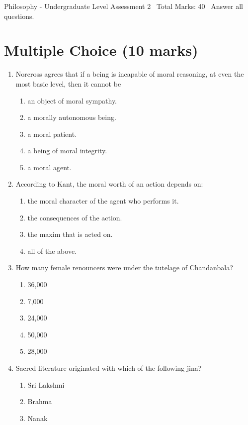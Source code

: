 \documentclass[12pt]{article}
\begin{document}
\begin{center}
Philosophy - Undergraduate Level Assessment 2 \
Total Marks: 40 \
Answer all questions.
\end{center}

\section*{Multiple Choice (10 marks)}
\begin{enumerate}[label=\arabic*.]
\item Norcross agrees that if a being is incapable of moral reasoning, at even the most basic level, then it cannot be
\begin{enumerate}[label=(\alph*)]
    \item an object of moral sympathy.
    \item a morally autonomous being.
    \item a moral patient.
    \item a being of moral integrity.
    \item a moral agent.
\end{enumerate}
\item According to Kant, the moral worth of an action depends on:
\begin{enumerate}[label=(\alph*)]
    \item the moral character of the agent who performs it.
    \item the consequences of the action.
    \item the maxim that is acted on.
    \item all of the above.
\end{enumerate}
\item How many female renouncers were under the tutelage of Chandanbala?
\begin{enumerate}[label=(\alph*)]
    \item 36,000
    \item 7,000
    \item 24,000
    \item 50,000
    \item 28,000
\end{enumerate}
\item Sacred literature originated with which of the following jina?
\begin{enumerate}[label=(\alph*)]
    \item Sri Lakshmi
    \item Brahma
    \item Nanak

\end{enumerate}
\end{enumerate}
\end{document}
